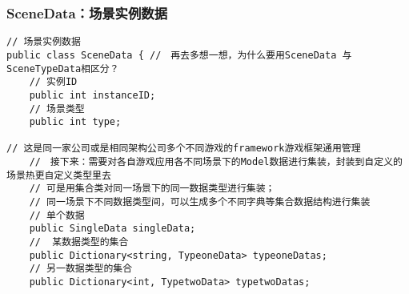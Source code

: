 \documentclass[9pt, b5paper]{article}
\begin{document}
\subsubsection{SceneData：场景实例数据}
\label{sec-2-1-1}
\begin{verbatim}
// 场景实例数据
public class SceneData { //　再去多想一想，为什么要用SceneData 与SceneTypeData相区分？
    // 实例ID
    public int instanceID;
    // 场景类型
    public int type;

// 这是同一家公司或是相同架构公司多个不同游戏的framework游戏框架通用管理
    //　接下来：需要对各自游戏应用各不同场景下的Model数据进行集装，封装到自定义的场景热更自定义类型里去
    // 可是用集合类对同一场景下的同一数据类型进行集装；
    // 同一场景下不同数据类型间，可以生成多个不同字典等集合数据结构进行集装
    // 单个数据
    public SingleData singleData;
    //  某数据类型的集合
    public Dictionary<string, TypeoneData> typeoneDatas;
    // 另一数据类型的集合
    public Dictionary<int, TypetwoData> typetwoDatas;


\end{verbatim}
\end{document}
